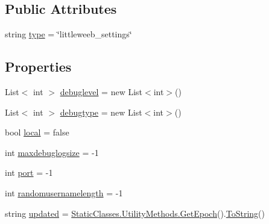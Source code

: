 \subsection*{Public Attributes}
\begin{DoxyCompactItemize}
\item 
string \mbox{\hyperlink{class_little_weeb_library_1_1_models_1_1_json_little_weeb_settings_a7129f2e6dce8f139b8875d5ff8cc2ddb}{type}} = \char`\"{}littleweeb\+\_\+settings\char`\"{}
\end{DoxyCompactItemize}
\subsection*{Properties}
\begin{DoxyCompactItemize}
\item 
List$<$ int $>$ \mbox{\hyperlink{class_little_weeb_library_1_1_models_1_1_json_little_weeb_settings_add95221dde294414735d4fc462121b78}{debuglevel}} = new List$<$int$>$()
\item 
List$<$ int $>$ \mbox{\hyperlink{class_little_weeb_library_1_1_models_1_1_json_little_weeb_settings_a63635018610bc5d1486d599340f76a24}{debugtype}} = new List$<$int$>$()
\item 
bool \mbox{\hyperlink{class_little_weeb_library_1_1_models_1_1_json_little_weeb_settings_a38486f6672a25851a1c1eb001e04dc4f}{local}} = false
\item 
int \mbox{\hyperlink{class_little_weeb_library_1_1_models_1_1_json_little_weeb_settings_a2163a3d5774f6923137da1066fddfe90}{maxdebuglogsize}} = -\/1
\item 
int \mbox{\hyperlink{class_little_weeb_library_1_1_models_1_1_json_little_weeb_settings_a2d8ad3ab7f7d224bed24e1f9b052edee}{port}} = -\/1
\item 
int \mbox{\hyperlink{class_little_weeb_library_1_1_models_1_1_json_little_weeb_settings_aedb0795f2506d53f01640372fa3e7e4e}{randomusernamelength}} = -\/1
\item 
string \mbox{\hyperlink{class_little_weeb_library_1_1_models_1_1_json_little_weeb_settings_a62e7dbb8c6431cb5090d4333da56d174}{updated}} = \mbox{\hyperlink{class_little_weeb_library_1_1_static_classes_1_1_utility_methods_a12336d9e64983ddabaad8950486fafb2}{Static\+Classes.\+Utility\+Methods.\+Get\+Epoch}}().\mbox{\hyperlink{class_little_weeb_library_1_1_models_1_1_json_little_weeb_settings_a9aca9f5ee262951043ae1fd7d58d3127}{To\+String}}()

\end{DoxyCompactItemize}
